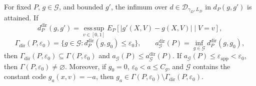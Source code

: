 For fixed \(P\), \(g\in\mathcal G\), and bounded \(g'\), the infimum over \(d\in\mathcal D_{\gamma_D,L_D}\) in \(d_P(g,g')\) is attained.  If
\[
 d_P^{\mathrm{dir}}(g,g')=\operatorname*{ess\,sup}_{v\in[0,1]}
 E_P[|g'(X,V)-g(X,V)|\mid V=v],
\]
\[
 \Gamma_{\mathrm{dir}}(P,\varepsilon_0)
 =\{g\in\mathcal G:d_P^{\mathrm{dir}}(g,g_0)\le\varepsilon_0\},
 \qquad
 a_{\mathcal G}^{\mathrm{dir}}(P)=\inf_{g\in\mathcal G}d_P^{\mathrm{dir}}(g,g_0),
\]
then \(\Gamma_{\mathrm{dir}}(P,\varepsilon_0)\subseteq\Gamma(P,\varepsilon_0)\) and \(a_{\mathcal G}(P)\le a_{\mathcal G}^{\mathrm{dir}}(P)\).  If \(a_{\mathcal G}(P)\le\varepsilon_{\mathrm{app}}<\varepsilon_0\), then \(\Gamma(P,\varepsilon_0)\ne\varnothing\).  Moreover, if \(g_0=0\), \(\varepsilon_0<a\le C_g\), and \(\mathcal G\) contains the constant code \(g_a(x,v)=-a\), then \(g_a\in\Gamma(P,\varepsilon_0)\setminus\Gamma_{\mathrm{dir}}(P,\varepsilon_0)\).
